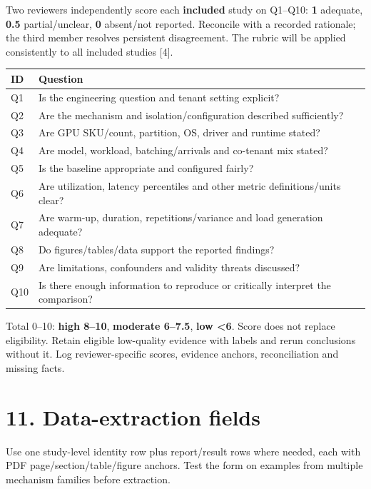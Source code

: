 \documentclass[
  12pt,
]{article}
\begin{document}
Two reviewers independently score each \textbf{included} study on
Q1--Q10: \textbf{1} adequate, \textbf{0.5} partial/unclear, \textbf{0}
absent/not reported. Reconcile with a recorded rationale; the third
member resolves persistent disagreement. The rubric will be applied
consistently to all included studies {[}4{]}.

\begin{longtable}[]{@{}p{}p{}@{}}
\toprule\noalign{}
ID & Question \\
\midrule\noalign{}
\endhead
\bottomrule\noalign{}
\endlastfoot
Q1 & Is the engineering question and tenant setting explicit? \\
Q2 & Are the mechanism and isolation/configuration described
sufficiently? \\
Q3 & Are GPU SKU/count, partition, OS, driver and runtime stated? \\
Q4 & Are model, workload, batching/arrivals and co-tenant mix stated? \\
Q5 & Is the baseline appropriate and configured fairly? \\
Q6 & Are utilization, latency percentiles and other metric
definitions/units clear? \\
Q7 & Are warm-up, duration, repetitions/variance and load generation
adequate? \\
Q8 & Do figures/tables/data support the reported findings? \\
Q9 & Are limitations, confounders and validity threats discussed? \\
Q10 & Is there enough information to reproduce or critically interpret
the comparison? \\
\end{longtable}

Total 0--10: \textbf{high 8--10}, \textbf{moderate 6--7.5}, \textbf{low
\textless6}. Score does not replace eligibility. Retain eligible
low-quality evidence with labels and rerun conclusions without it. Log
reviewer-specific scores, evidence anchors, reconciliation and missing
facts.

\hypertarget{11-data-extraction-fields}{%
\section{11. Data-extraction fields}\label{11-data-extraction-fields}}

Use one study-level identity row plus report/result rows where needed,
each with PDF page/section/table/figure anchors. Test the form on
examples from multiple mechanism families before extraction.
\end{document}
